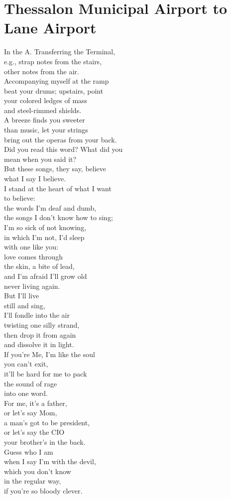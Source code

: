 \documentclass[smalldemyvopaper,11pt,twoside,onecolumn,openright,extrafontsizes]{memoir}
\newlength\drop
\begin{document}
\chapter{Thessalon Municipal Airport to Lane Airport}
In the A. Transferring the Terminal,
\\e.g., strap notes from the stairs,
\\other notes from the air.
\\Accompanying myself at the ramp
\\beat your drums; upstairs, point
\\your colored ledges of mass
\\and steel-rimmed shields.
\\A breeze finds you sweeter
\\than music, let your strings
\\bring out the operas from your back.
\\Did you read this word? What did you
\\mean when you said it?
\\But these songs, they say, believe
\\what I say I believe.
\\I stand at the heart of what I want
\\to believe:
\\the words I'm deaf and dumb,
\\the songs I don't know how to sing;
\\I'm so sick of not knowing,
\\in which I'm not, I'd sleep
\\with one like you:
\\love comes through
\\the skin, a bite of lead,
\\and I'm afraid I'll grow old
\\never living again.
\\But I'll live
\\still and sing,
\\I'll fondle into the air
\\twisting one silly strand,
\\then drop it from again
\\and dissolve it in light.
\\If you're Me, I'm like the soul
\\you can't exit,
\\it'll be hard for me to pack
\\the sound of rage
\\into one word.
\\For me, it's a father,
\\or let's say Mom,
\\a man's got to be president,
\\or let's say the CIO
\\your brother's in the back.
\\Guess who I am
\\when I say I'm with the devil,
\\which you don't know
\\in the regular way,
\\if you're so bloody clever.
\end{document}
